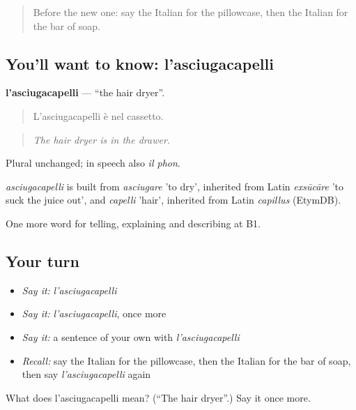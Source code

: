 \label{lesson:IT-C433-asciugacapelli}



\begin{quote}
Before the new one: say the Italian for the pillowcase, then the Italian for the bar of soap.
\end{quote}

\subsection*{You'll want to know: l'asciugacapelli}
\textbf{l'asciugacapelli} — \textquotedblleft{}the hair dryer\textquotedblright{}.

\begin{quote}
L'asciugacapelli è nel cassetto.
\end{quote}

\begin{quote}
\emph{The hair dryer is in the drawer.}
\end{quote}

Plural unchanged; in speech also \emph{il phon}.

\begin{cousinweb}
\emph{asciugacapelli} is built from \emph{asciugare} 'to dry', inherited from Latin \emph{exsūcāre} 'to suck the juice out', and \emph{capelli} 'hair', inherited from Latin \emph{capillus} (EtymDB).
\end{cousinweb}

\begin{grammarlens}[title={What you've built}]
One more word for telling, explaining and describing at B1.
\end{grammarlens}

\subsection*{Your turn}
\begin{itemize}
\raggedright
  \item \emph{Say it:} \emph{l'asciugacapelli}
  \item \emph{Say it:} \emph{l'asciugacapelli}, once more
  \item \emph{Say it:} a sentence of your own with \emph{l'asciugacapelli}
  \item \emph{Recall:} say the Italian for the pillowcase, then the Italian for the bar of soap, then say \emph{l'asciugacapelli} again
\end{itemize}

\begin{tcolorbox}[breakable,colback=teal!4,colframe=teal!35!black,title={Before you move on}]
What does l'asciugacapelli mean? (\textquotedblleft{}The hair dryer\textquotedblright{}.) Say it once more.
\end{tcolorbox}
